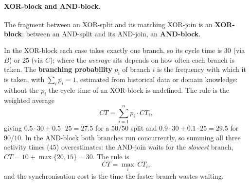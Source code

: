 \paragraph{XOR-block and AND-block.} The fragment between an XOR-split and its matching XOR-join is an \textbf{XOR-block}; between an AND-split and its AND-join, an \textbf{AND-block}.
\begin{center}
\hspace{0.8cm}
\end{center}
In the XOR-block each case takes exactly one branch, so its cycle time is $30$ (via $B$) or $25$ (via $C$); where the \emph{average} sits depends on how often each branch is taken. The \textbf{branching probability} $p_i$ of branch $i$ is the frequency with which it is taken, with $\sum_i p_i = 1$, estimated from historical data or domain knowledge: without the $p_i$ the cycle time of an XOR-block is undefined. The rule is the weighted average
$$CT = \sum_{i=1}^{n} p_i \cdot CT_i,$$
giving $0.5 \cdot 30 + 0.5 \cdot 25 = 27.5$ for a $50/50$ split and $0.9 \cdot 30 + 0.1 \cdot 25 = 29.5$ for $90/10$. In the AND-block both branches run concurrently, so summing all three activity times ($45$) overestimates: the AND-join waits for the \emph{slowest} branch, $CT = 10 + \max\{20, 15\} = 30$. The rule is
$$CT = \max_i\, CT_i,$$
and the synchronisation cost is the time the faster branch wastes waiting.

